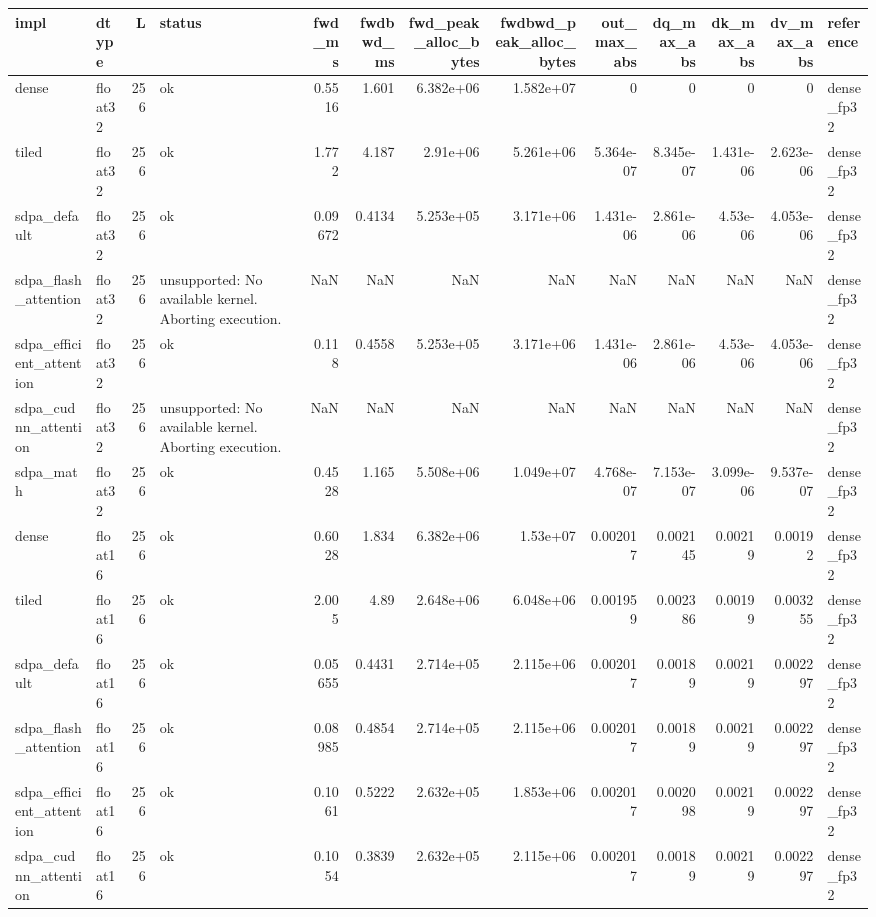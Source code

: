 \begin{table}
\label{tab:task2a_attention_full}
\begin{tabular}{llrlrrrrrrrrl}
\toprule
impl & dtype & L & status & fwd\_ms & fwdbwd\_ms & fwd\_peak\_alloc\_bytes & fwdbwd\_peak\_alloc\_bytes & out\_max\_abs & dq\_max\_abs & dk\_max\_abs & dv\_max\_abs & reference \\
\midrule
dense & float32 & 256 & ok & 0.5516 & 1.601 & 6.382e+06 & 1.582e+07 & 0 & 0 & 0 & 0 & dense\_fp32 \\
tiled & float32 & 256 & ok & 1.772 & 4.187 & 2.91e+06 & 5.261e+06 & 5.364e-07 & 8.345e-07 & 1.431e-06 & 2.623e-06 & dense\_fp32 \\
sdpa\_default & float32 & 256 & ok & 0.09672 & 0.4134 & 5.253e+05 & 3.171e+06 & 1.431e-06 & 2.861e-06 & 4.53e-06 & 4.053e-06 & dense\_fp32 \\
sdpa\_flash\_attention & float32 & 256 & unsupported: No available kernel. Aborting execution. & NaN & NaN & NaN & NaN & NaN & NaN & NaN & NaN & dense\_fp32 \\
sdpa\_efficient\_attention & float32 & 256 & ok & 0.118 & 0.4558 & 5.253e+05 & 3.171e+06 & 1.431e-06 & 2.861e-06 & 4.53e-06 & 4.053e-06 & dense\_fp32 \\
sdpa\_cudnn\_attention & float32 & 256 & unsupported: No available kernel. Aborting execution. & NaN & NaN & NaN & NaN & NaN & NaN & NaN & NaN & dense\_fp32 \\
sdpa\_math & float32 & 256 & ok & 0.4528 & 1.165 & 5.508e+06 & 1.049e+07 & 4.768e-07 & 7.153e-07 & 3.099e-06 & 9.537e-07 & dense\_fp32 \\
dense & float16 & 256 & ok & 0.6028 & 1.834 & 6.382e+06 & 1.53e+07 & 0.002017 & 0.002145 & 0.00219 & 0.00192 & dense\_fp32 \\
tiled & float16 & 256 & ok & 2.005 & 4.89 & 2.648e+06 & 6.048e+06 & 0.001959 & 0.002386 & 0.00199 & 0.003255 & dense\_fp32 \\
sdpa\_default & float16 & 256 & ok & 0.05655 & 0.4431 & 2.714e+05 & 2.115e+06 & 0.002017 & 0.00189 & 0.00219 & 0.002297 & dense\_fp32 \\
sdpa\_flash\_attention & float16 & 256 & ok & 0.08985 & 0.4854 & 2.714e+05 & 2.115e+06 & 0.002017 & 0.00189 & 0.00219 & 0.002297 & dense\_fp32 \\
sdpa\_efficient\_attention & float16 & 256 & ok & 0.1061 & 0.5222 & 2.632e+05 & 1.853e+06 & 0.002017 & 0.002098 & 0.00219 & 0.002297 & dense\_fp32 \\
sdpa\_cudnn\_attention & float16 & 256 & ok & 0.1054 & 0.3839 & 2.632e+05 & 2.115e+06 & 0.002017 & 0.00189 & 0.00219 & 0.002297 & dense\_fp32 \\

\end{tabular}
\end{table}
